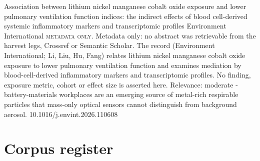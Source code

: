 \documentclass[10pt]{article}
\begin{document}
{Association between lithium nickel manganese cobalt oxide exposure and lower pulmonary ventilation function indices: the indirect effects of blood cell-derived systemic inflammatory markers and transcriptomic profiles}
{Environment International}
{\textsc{metadata only.} Metadata only: no abstract was retrievable from the harvest legs, Crossref or Semantic Scholar. The record (Environment International; Li, Liu, Hu, Fang) relates lithium nickel manganese cobalt oxide exposure to lower pulmonary ventilation function and examines mediation by blood-cell-derived inflammatory markers and transcriptomic profiles. No finding, exposure metric, cohort or effect size is asserted here. Relevance: moderate - battery-materials workplaces are an emerging source of metal-rich respirable particles that mass-only optical sensors cannot distinguish from background aerosol.}
{10.1016/j.envint.2026.110608}

\clearpage
\section*{\sffamily\bfseries\color{Deep}Corpus register}
\vspace{-1.5mm}{\color{Amber}\rule{\linewidth}{1.1pt}}\vspace{2.5mm}



\vspace{2mm}
\end{document}
